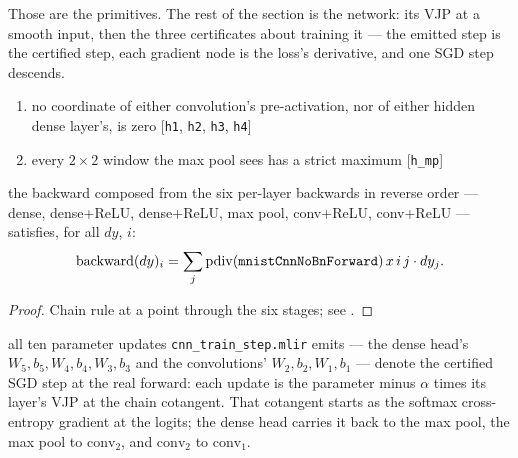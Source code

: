 Those are the primitives. The rest of the section is the network: its VJP at
a smooth input, then the three certificates about training it --- the emitted
step is the certified step, each gradient node is the loss's derivative, and
one SGD step descends.

\begin{theorem}
  \label{thm:mnistCnnNoBnHasVJPAt}
  \leanok
  \Assume{}
  \begin{enumerate}
    \item no coordinate of either convolution's pre-activation, nor of
          either hidden dense layer's, is zero
          \hfill[\texttt{h1}, \texttt{h2}, \texttt{h3}, \texttt{h4}]
    \item every \(2 \times 2\) window the max pool sees has a strict
          maximum \hfill[\texttt{h\_mp}]
  \end{enumerate}
  \Prove{} the backward composed from the six per-layer backwards in reverse
  order --- dense, dense+ReLU, dense+ReLU, max pool, conv+ReLU, conv+ReLU ---
  satisfies, for all \(dy\), \(i\):
  \[
    \mathrm{backward}(dy)_i
      = \sum_j \operatorname{pdiv}(\texttt{mnistCnnNoBnForward})\, x\, i\, j \cdot dy_j .
  \]
\end{theorem}

\begin{proof}
\leanok
Chain rule at a point through the six stages; see
.
\end{proof}
\begin{theorem}
  \label{thm:cnn_fold}
  \leanok
  \Prove{} all ten parameter updates \texttt{cnn\_train\_step.mlir} emits
  --- the dense head's \(W_5, b_5, W_4, b_4, W_3, b_3\) and the convolutions'
  \(W_2, b_2, W_1, b_1\) --- denote the certified SGD step at the real
  forward: each update is the parameter minus \(\alpha\) times its layer's
  VJP at the chain cotangent. That cotangent starts as the softmax
  cross-entropy gradient at the logits; the dense head carries it back to the
  max pool, the max pool to \(\mathrm{conv}_2\), and \(\mathrm{conv}_2\) to
  \(\mathrm{conv}_1\).
\end{theorem}


